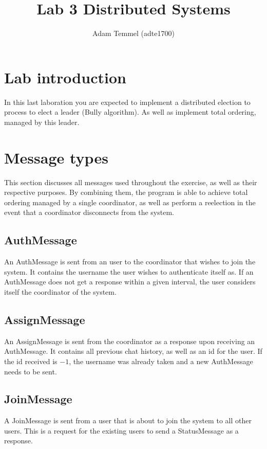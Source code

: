 \documentclass[a4paper, titlepage,12pt]{article}
\title{Lab 3 Distributed Systems}
\author{Adam Temmel (adte1700)}
\begin{document}
\maketitle

\section{Lab introduction}
	In this last laboration you are expected to implement a distributed election to process to elect a leader (Bully algorithm). As well as implement total ordering, managed by this leader.

\section{Message types}

This section discusses all messages used throughout the exercise, as well as their respective purposes. By combining them, the program is able to achieve total ordering managed by a single coordinator, as well as perform a reelection in the event that a coordinator disconnects from the system.

\subsection{AuthMessage}

	An AuthMessage is sent from an user to the coordinator that wishes to join the system. It contains the username the user wishes to authenticate itself as. If an AuthMessage does not get a response within a given interval, the user considers itself the coordinator of the system.

\subsection{AssignMessage}
	An AssignMessage is sent from the coordinator as a response upon receiving an AuthMessage. It contains all previous chat history, as well as an id for the user. If the id received is $-1$, the username was already taken and a new AuthMessage needs to be sent.

\subsection{JoinMessage}
	A JoinMessage is sent from a user that is about to join the system to all other users. This is a request for the existing users to send a StatusMessage as a response.
\end{document}
